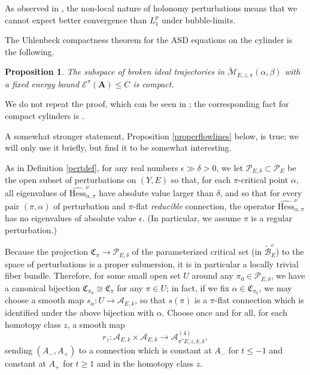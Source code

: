 \documentclass[10pt,a4paper]{amsart}
\newcommand{\pE}{\pi^* \! E}
\newtheorem{proposition}[theorem]{Proposition}
\theoremstyle{definition}
\theoremstyle{remark}
\numberwithin{figure}{qchap}
\begin{document}
As observed in \cite{Kronheimer}, the non-local nature of holonomy perturbations means that we cannot expect better convergence than $L^p_1$ under bubble-limits.

The Uhlenbeck compactness theorem for the ASD equations on the cylinder is the following.

\begin{proposition}The subspace of broken ideal trajectories in $\check{\mathcal M}_{E,z,\pi}(\alpha, \beta)$ with a fixed energy bound $\mathcal E^\pi(\mathbf{A}) \leq C$ is compact.
\end{proposition}

We do not repeat the proof, which can be seen in \cite[Section~5.1]{Don}; the corresponding fact for compact cylinders is \cite[Proposition~3.20]{KM1}.

A somewhat stronger statement, Proposition \ref{properflowlines} below, is true; we will only use it briefly, but find it to be somewhat interesting. 

As in Definition \ref{pertdef}, for any real numbers $\epsilon \gg \delta > 0$, we let $\mathcal P_{E,\delta} \subset \mathcal P_E$ be the open subset of perturbations on $(Y,E)$ so that, for each $\pi$-critical point $\alpha$, all eigenvalues of $\widehat{\text{Hess}}^\nu_{\alpha,\pi}$ have absolute value larger than $\delta$, and so that for every pair $(\pi, \alpha)$ of perturbation and $\pi$-flat \emph{reducible} connection, the operator $\widehat{\text{Hess}}^\nu_{\alpha,\pi}$ has no eigenvalues of absolute value $\epsilon$. (In particular, we assume $\pi$ is a regular perturbation.) 

Because the projection $\mathfrak C_\pi \to \mathcal P_{E,\delta}$ of the parameterized critical set (in $\widetilde{\mathcal B}^e_E$) to the space of perturbations is a proper submersion, it is in particular a locally trivial fiber bundle. Therefore, for some small open set $U$ around any $\pi_0 \in \mathcal P_{E,\delta}$, we have a canonical bijection $\mathfrak C_{\pi_0} \cong \mathfrak C_{\pi}$ for any $\pi \in U$; in fact, if we fix $\alpha \in \mathfrak C_{\pi_0}$, we may choose a smooth map $s_\alpha: U \to \mathcal A_{E,k}$, so that $s(\pi)$ is a $\pi$-flat connection which is identified under the above bijection with $\alpha$. Choose once and for all, for each homotopy class $z$, a smooth map 
$$r_z: \mathcal A_{E,k} \times \mathcal A_{E,k} \to \mathcal A^{(4)}_{\pE,z,k,\delta},$$ 
sending $(A_-, A_+)$ to a connection which is constant at $A_-$ for $t \leq -1$ and constant at $A_+$ for $t \geq 1$ and in the homotopy class $z$. 
\end{document}
